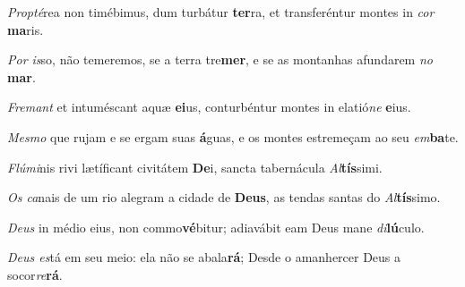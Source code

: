 \begin{greenumerate}
  \setcounter{enumi}{1}


  \item \textit{Propté}rea non timébimus, dum turbátur \textbf{ter}ra, {\GreStar} et transferéntur montes in \textit{cor} \textbf{ma}ris. 

  \switchcolumn\setcounter{enumi}{1}

  \item \textit{Por is}so, não temeremos, se a terra tre\textbf{mer}, {\GreStar} e se as montanhas afundarem \textit{no} \textbf{mar}. 

  \switchcolumn*


  \item \textit{Fremant} et intuméscant aquæ \textbf{ei}us, {\GreStar} conturbéntur montes in elatió\textit{ne} \textbf{e}ius. 

  \switchcolumn%

  \item \textit{Mesmo} que rujam e se ergam suas \textbf{á}guas, {\GreStar} e os montes estremeçam ao seu \textit{em}\textbf{ba}te. 

  \switchcolumn*


  \item \textit{Flúmi}nis rivi lætíficant civitátem \textbf{De}i, {\GreStar} sancta tabernácula \textit{Al}\textbf{tís}simi. 

  \switchcolumn%

  \item \textit{Os ca}nais de um rio alegram a cidade de \textbf{Deus}, {\GreStar} as tendas santas do \textit{Al}\textbf{tís}simo. 

  \switchcolumn*


  \item \textit{Deus} in médio eius, non commo\textbf{vé}bitur; {\GreStar} adiavábit eam Deus mane \textit{di}\textbf{lú}culo. 

  \switchcolumn%

  \item \textit{Deus es}tá em seu meio: ela não se abala\textbf{rá}; {\GreStar} Desde o amanhercer Deus a socor\textit{re}\textbf{rá}. 


\end{greenumerate}
